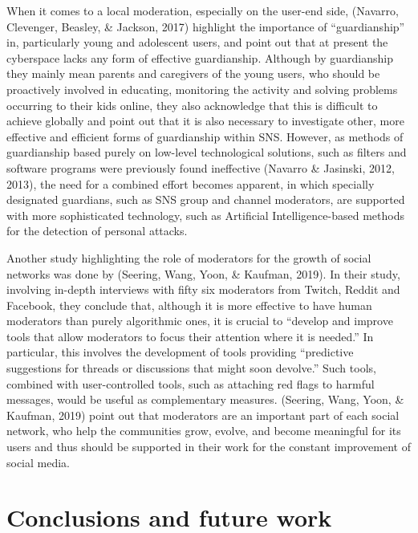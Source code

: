 \documentclass[
  10pt,
  dvipsnames]{scrartcl}
\begin{document}
When it comes to a local moderation, especially on the user-end side,
(Navarro, Clevenger, Beasley, \& Jackson, 2017) highlight the importance
of ``guardianship'' in, particularly young and adolescent users, and
point out that at present the cyberspace lacks any form of effective
guardianship. Although by guardianship they mainly mean parents and
caregivers of the young users, who should be proactively involved in
educating, monitoring the activity and solving problems occurring to
their kids online, they also acknowledge that this is difficult to
achieve globally and point out that it is also necessary to investigate
other, more effective and efficient forms of guardianship within SNS.
However, as methods of guardianship based purely on low-level
technological solutions, such as filters and software programs were
previously found ineffective (Navarro \& Jasinski, 2012, 2013), the need
for a combined effort becomes apparent, in which specially designated
guardians, such as SNS group and channel moderators, are supported with
more sophisticated technology, such as Artificial Intelligence-based
methods for the detection of personal attacks.

Another study highlighting the role of moderators for the growth of
social networks was done by (Seering, Wang, Yoon, \& Kaufman, 2019). In
their study, involving in-depth interviews with fifty six moderators
from Twitch, Reddit and Facebook, they conclude that, although it is
more effective to have human moderators than purely algorithmic ones, it
is crucial to ``develop and improve tools that allow moderators to focus
their attention where it is needed.'' In particular, this involves the
development of tools providing ``predictive suggestions for threads or
discussions that might soon devolve.'' Such tools, combined with
user-controlled tools, such as attaching red flags to harmful messages,
would be useful as complementary measures. (Seering, Wang, Yoon, \&
Kaufman, 2019) point out that moderators are an important part of each
social network, who help the communities grow, evolve, and become
meaningful for its users and thus should be supported in their work for
the constant improvement of social media.

\section{Conclusions and future work}
\label{conclusions}
\end{document}
